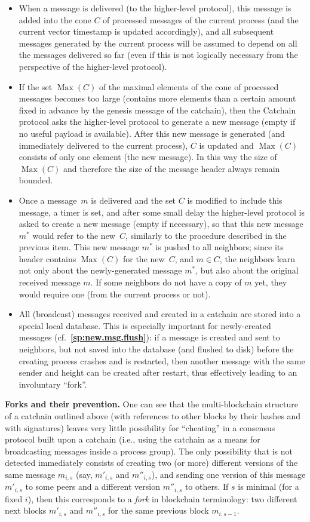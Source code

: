\documentclass[12pt,oneside]{article}
\def\makepoint#1{\medbreak\noindent{\bf #1.\ }}
\def\nxpoint{\refstepcounter{subsection}%
  \smallbreak\makepoint{\thesubsection}}
\def\refpoint#1{{\rm\textbf{\ref{#1}}}}
\let\ptref=\refpoint
\def\emb#1{\textbf{#1.}}
\def\Max{\operatorname{Max}}
\begin{document}
\begin{itemize}
\item When a message is delivered (to the higher-level protocol), this message is added into the cone $C$ of processed messages of the current process (and the current vector timestamp is updated accordingly), and all subsequent messages generated by the current process will be assumed to depend on all the messages delivered so far (even if this is not logically necessary from the perspective of the higher-level protocol).
\item If the set $\Max(C)$ of the maximal elements of the cone of processed messages becomes too large (contains more elements than a certain amount fixed in advance by the genesis message of the catchain), then the Catchain protocol asks the higher-level protocol to generate a new message (empty if no useful payload is available). After this new message is generated (and immediately delivered to the current process), $C$ is updated and $\Max(C)$ consists of only one element (the new message). In this way the size of $\Max(C)$ and therefore the size of the message header always remain bounded.
\item Once a message~$m$ is delivered and the set $C$ is modified to include this message, a timer is set, and after some small delay the higher-level protocol is asked to create a new message (empty if necessary), so that this new message $m^*$ would refer to the new~$C$, similarly to the procedure described in the previous item. This new message $m^*$ is pushed to all neighbors; since its header contains $\Max(C)$ for the new~$C$, and $m\in C$, the neighbors learn not only about the newly-generated message $m^*$, but also about the original received message $m$. If some neighbors do not have a copy of $m$ yet, they would require one (from the current process or not).
\item All (broadcast) messages received and created in a catchain are stored into a special local database. This is especially important for newly-created messages (cf.~\ptref{sp:new.msg.flush}): if a message is created and sent to neighbors, but not saved into the database (and flushed to disk) before the creating process crashes and is restarted, then another message with the same sender and height can be created after restart, thus effectively leading to an involuntary ``fork''.
\end{itemize}

\nxpoint\emb{Forks and their prevention}
One can see that the multi-blockchain structure of a catchain outlined above (with references to other blocks by their hashes and with signatures) leaves very little possibility for ``cheating'' in a consensus protocol built upon a catchain (i.e., using the catchain as a means for broadcasting messages inside a process group). The only possibility that is not detected immediately consists of creating two (or more) different versions of the same message $m_{i,s}$ (say, $m'_{i,s}$ and $m''_{i,s}$), and sending one version of this message $m'_{i,s}$ to some peers and a different version $m''_{i,s}$ to others. If $s$ is minimal (for a fixed $i$), then this corresponds to a {\em fork\/} in blockchain terminology: two different next blocks $m'_{i,s}$ and $m''_{i,s}$ for the same previous block $m_{i,s-1}$.
\end{document}
